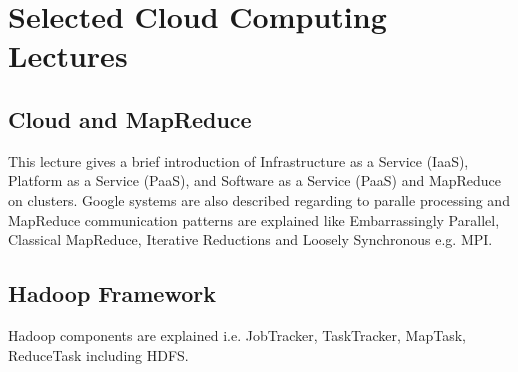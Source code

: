 \chapter{Selected Cloud Computing Lectures}
\label{sec:icloud-selected-lectures}

\FILENAME

\begin{comment}
  \section{Selected Cloud Computing Lectures after Review}

  The following video lectures and slides are selectively collected to use in
  the current class E516/616 if we found the materials are still valid to teach
  and meaningful although recording was made a few years ago. This might be
  true if general concepts and theories have not changed over time. Some
  modification or re-recording will occur if necessary.

\end{comment}

\section{Cloud and MapReduce}

This lecture gives a brief introduction of Infrastructure as a Service (IaaS),
Platform as a Service (PaaS), and Software as a Service (PaaS) and MapReduce on
clusters. Google systems are also described regarding to paralle processing and
MapReduce communication patterns are explained like Embarrassingly Parallel,
Classical MapReduce, Iterative Reductions and Loosely Synchronous e.g. MPI.


\section{Hadoop Framework}

Hadoop components are explained i.e. JobTracker, TaskTracker, MapTask,
ReduceTask including HDFS.


